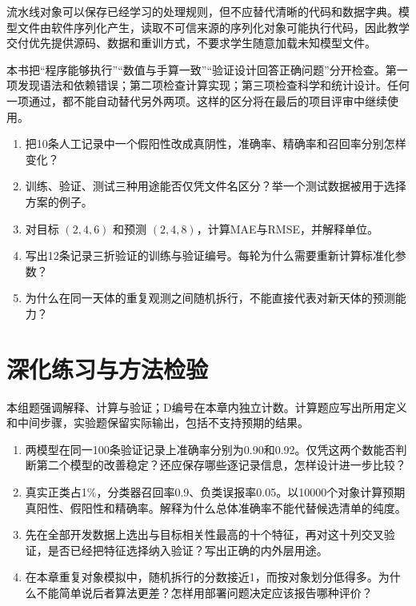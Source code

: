 流水线对象可以保存已经学习的处理规则，但不应替代清晰的代码和数据字典。模型文件由软件序列化产生，读取不可信来源的序列化对象可能执行代码，因此教学交付优先提供源码、数据和重训方式，不要求学生随意加载未知模型文件。

本书把“程序能够执行”“数值与手算一致”“验证设计回答正确问题”分开检查。第一项发现语法和依赖错误；第二项检查计算实现；第三项检查科学和统计设计。任何一项通过，都不能自动替代另外两项。这样的区分将在最后的项目评审中继续使用。

\chapterexercise
\begin{enumerate}
\item 把10条人工记录中一个假阳性改成真阴性，准确率、精确率和召回率分别怎样变化？
\item 训练、验证、测试三种用途能否仅凭文件名区分？举一个测试数据被用于选择方案的例子。
\item 对目标 $(2,4,6)$ 和预测 $(2,4,8)$，计算MAE与RMSE，并解释单位。
\item 写出12条记录三折验证的训练与验证编号。每轮为什么需要重新计算标准化参数？
\item 为什么在同一天体的重复观测之间随机拆行，不能直接代表对新天体的预测能力？
\end{enumerate}

\section*{深化练习与方法检验}
本组题强调解释、计算与验证；D编号在本章内独立计数。计算题应写出所用定义和中间步骤，实验题保留实际输出，包括不支持预期的结果。
\begin{enumerate}[label=D\arabic*.]
\item 两模型在同一100条验证记录上准确率分别为0.90和0.92。仅凭这两个数能否判断第二个模型的改善稳定？还应保存哪些逐记录信息，怎样设计进一步比较？
\item 真实正类占1\%，分类器召回率0.9、负类误报率0.05。以10000个对象计算预期真阳性、假阳性和精确率。解释为什么总体准确率不能代替候选清单的纯度。
\item 先在全部开发数据上选出与目标相关性最高的十个特征，再对这十列交叉验证，是否已经把特征选择纳入验证？写出正确的内外层用途。
\item 在本章重复对象模拟中，随机拆行的分数接近1，而按对象划分低得多。为什么不能简单说后者算法更差？怎样用部署问题决定应该报告哪种评价？
\end{enumerate}
